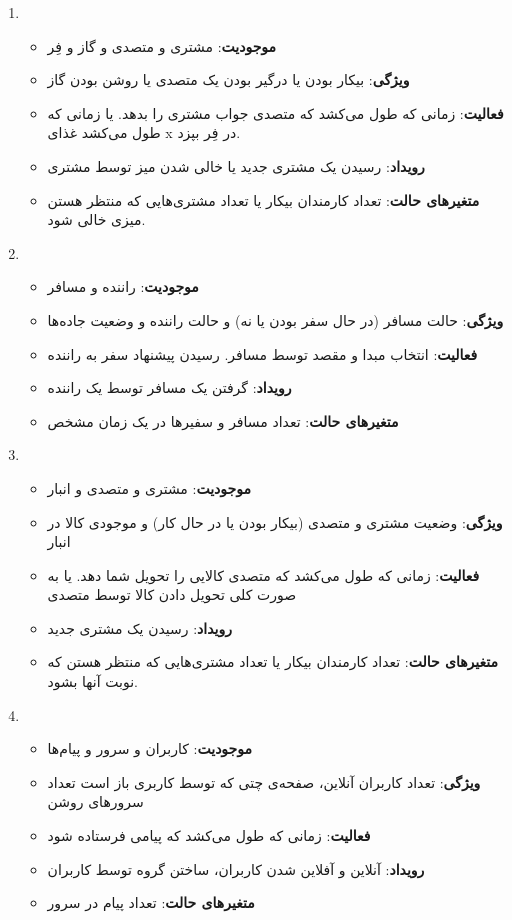 \begin{enumerate}
    \item \begin{itemize}
        \item \textbf{موجودیت}: مشتری و متصدی و گاز و فِر
        \item \textbf{ویژگی}: بیکار بودن یا درگیر بودن یک متصدی یا روشن بودن گاز
        \item \textbf{فعالیت}: زمانی که طول می‌کشد که متصدی جواب مشتری را بدهد. یا زمانی که طول می‌کشد غذای x در فِر بپزد.
        \item \textbf{رویداد}: رسیدن یک مشتری جدید یا خالی شدن میز توسط مشتری
        \item \textbf{متغیر‌های حالت}: تعداد کارمندان بیکار یا تعداد مشتری‌هایی که منتظر هستن میزی خالی شود. 
    \end{itemize}
    \item \begin{itemize}
        \item \textbf{موجودیت}: راننده و مسافر
        \item \textbf{ویژگی}: حالت مسافر (در حال سفر بودن یا نه) و حالت راننده و وضعیت جاده‌ها
        \item \textbf{فعالیت}: انتخاب مبدا و مقصد توسط مسافر. رسیدن پیشنهاد سفر به راننده
        \item \textbf{رویداد}: گرفتن یک مسافر توسط یک راننده
        \item \textbf{متغیر‌های حالت}: تعداد مسافر و سفیر‌ها در یک زمان مشخص
    \end{itemize}
    \item \begin{itemize}
        \item \textbf{موجودیت}: مشتری و متصدی و انبار
        \item \textbf{ویژگی}: وضعیت مشتری و متصدی (بیکار بودن یا در حال کار) و موجودی کالا در انبار
        \item \textbf{فعالیت}: زمانی که طول می‌کشد که متصدی کالایی را تحویل شما دهد. یا به صورت کلی تحویل دادن کالا توسط متصدی
        \item \textbf{رویداد}: رسیدن یک مشتری جدید
        \item \textbf{متغیر‌های حالت}: تعداد کارمندان بیکار یا تعداد مشتری‌هایی که منتظر هستن که نوبت آنها بشود. 
    \end{itemize}
    \item \begin{itemize}
        \item \textbf{موجودیت}: کاربران و سرور و پیام‌ها
        \item \textbf{ویژگی}: تعداد کاربران آنلاین، صفحه‌ی چتی که توسط کاربری باز است تعداد سرور‌های روشن
        \item \textbf{فعالیت}: زمانی که طول می‌کشد که پیامی فرستاده شود
        \item \textbf{رویداد}: آنلاین و آفلاین شدن کاربران، ساختن گروه توسط کاربران
        \item \textbf{متغیر‌های حالت}: تعداد پیام  در سرور
    \end{itemize}
\end{enumerate}